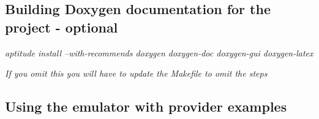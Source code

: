\subsection*{Building Doxygen documentation for the project -\/ optional}


\begin{DoxyItemize}
\item {\itshape aptitude install --with-\/recommends doxygen doxygen-\/doc doxygen-\/gui doxygen-\/latex}
\item {\itshape If you omit this you will have to update the Makefile to omit the steps} 


\end{DoxyItemize}

\subsection*{Using the emulator with provider examples}


